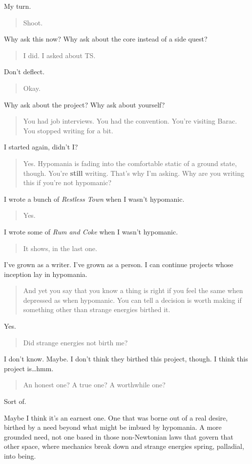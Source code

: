 My turn.

\begin{quote}
Shoot.
\end{quote}

Why ask this now? Why ask about the core instead of a side quest?

\begin{quote}
I did. I asked about TS.
\end{quote}

Don't deflect.

\begin{quote}
Okay.
\end{quote}

Why ask about the project? Why ask about yourself?

\begin{quote}
You had job interviews. You had the convention. You're visiting Barac. You stopped writing for a bit.
\end{quote}

I started again, didn't I?

\begin{quote}
Yes. Hypomania is fading into the comfortable static of a ground state, though. You're \textbf{still} writing. That's why I'm asking. Why are you writing this if you're not hypomanic?
\end{quote}

I wrote a bunch of \emph{Restless Town} when I wasn't hypomanic.

\begin{quote}
Yes.
\end{quote}

I wrote some of \emph{Rum and Coke} when I wasn't hypomanic.

\begin{quote}
It shows, in the last one.
\end{quote}

I've grown as a writer. I've grown as a person. I can continue projects whose inception lay in hypomania.

\begin{quote}
And yet you say that you know a thing is right if you feel the same when depressed as when hypomanic. You can tell a decision is worth making if something other than strange energies birthed it.
\end{quote}

Yes.

\begin{quote}
Did strange energies not birth me?
\end{quote}

I don't know. Maybe. I don't think they birthed this project, though. I think this project is\ldots{}hmm.

\begin{quote}
An honest one? A true one? A worthwhile one?
\end{quote}

Sort of.

Maybe I think it's an earnest one. One that was borne out of a real desire, birthed by a need beyond what might be imbued by hypomania. A more grounded need, not one based in those non-Newtonian laws that govern that other space, where mechanics break down and strange energies spring, palladial, into being.
